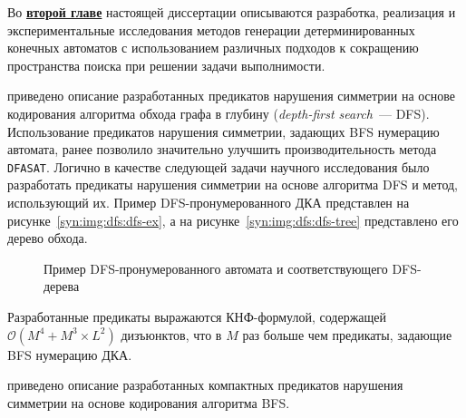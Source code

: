 
Во \textbf{\underline{второй главе}} настоящей диссертации описываются разработка, реализация и экспериментальные исследования методов генерации детерминированных конечных автоматов с использованием различных подходов к сокращению пространства поиска при решении задачи выполнимости.

\insection{\ref{sec:space:dfs}} приведено описание разработанных предикатов нарушения симметрии на основе кодирования алгоритма обхода графа в глубину (\emph{depth-first search}~--- DFS). 
Использование предикатов нарушения симметрии, задающих BFS нумерацию автомата, ранее позволило значительно улучшить производительность метода \texttt{DFASAT}.
Логично в качестве следующей задачи научного исследования было разработать предикаты нарушения симметрии на основе алгоритма DFS и метод, использующий их.
Пример DFS-пронумерованного ДКА представлен на рисунке~\ref{syn:img:dfs:dfs-ex}, а на рисунке~\ref{syn:img:dfs:dfs-tree} представлено его дерево обхода.

\begin{figure}[ht]
  \centering
  \hfill
  \caption{Пример DFS-пронумерованного автомата и соответствующего DFS-дерева}
  \label{syn:img:dfs}
\end{figure}

Разработанные предикаты выражаются КНФ-формулой, содержащей $\mathcal{O}\left(M^{4} + M^{3} \times L^{2}\right)$ дизъюнктов, что в $M$ раз больше чем предикаты, задающие BFS нумерацию ДКА.

\insection{\ref{sec:space:tight}} приведено описание разработанных компактных предикатов нарушения симметрии на основе кодирования алгоритма BFS.

